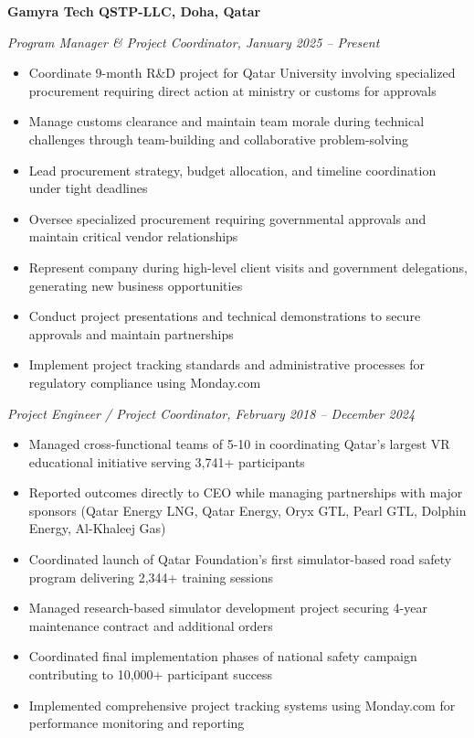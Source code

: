 \documentclass[a4paper,12pt]{article}
\begin{document}
\textbf{Gamyra Tech QSTP-LLC, Doha, Qatar}

\small{\textit{Program Manager \& Project Coordinator, January 2025 -- Present}}

\begin{itemize}[nosep,after=\strut, leftmargin=1em, itemsep=3pt,label=--]
\item Coordinate 9-month R\&D project for Qatar University involving specialized procurement requiring direct action at ministry or customs for approvals
\item Manage customs clearance and maintain team morale during technical challenges through team-building and collaborative problem-solving
\item Lead procurement strategy, budget allocation, and timeline coordination under tight deadlines
\item Oversee specialized procurement requiring governmental approvals and maintain critical vendor relationships
\item Represent company during high-level client visits and government delegations, generating new business opportunities
\item Conduct project presentations and technical demonstrations to secure approvals and maintain partnerships
\item Implement project tracking standards and administrative processes for regulatory compliance using Monday.com
\end{itemize}

\small{\textit{Project Engineer / Project Coordinator, February 2018 -- December 2024}}

\begin{itemize}[nosep,after=\strut, leftmargin=1em, itemsep=3pt,label=--]
\item Managed cross-functional teams of 5-10 in coordinating Qatar's largest VR educational initiative serving 3,741+ participants
\item Reported outcomes directly to CEO while managing partnerships with major sponsors (Qatar Energy LNG, Qatar Energy, Oryx GTL, Pearl GTL, Dolphin Energy, Al-Khaleej Gas)
\item Coordinated launch of Qatar Foundation's first simulator-based road safety program delivering 2,344+ training sessions
\item Managed research-based simulator development project securing 4-year maintenance contract and additional orders
\item Coordinated final implementation phases of national safety campaign contributing to 10,000+ participant success
\item Implemented comprehensive project tracking systems using Monday.com for performance monitoring and reporting
\end{itemize}
\end{document}
